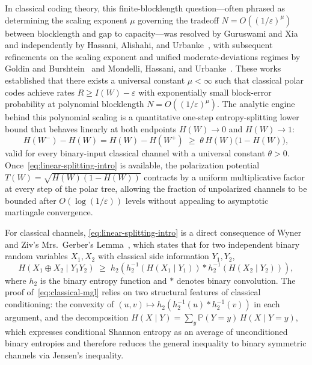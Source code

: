 \documentclass[10pt,a4paper]{article}
\numberwithin{equation}{section}
\theoremstyle{plain}
\theoremstyle{definition}
\theoremstyle{remark}
\newcommand{\bP}{\mathbb{P}}
\begin{document}
In classical coding theory, this finite-blocklength question—often phrased as determining the scaling exponent $\mu$ governing the tradeoff $N = O((1/\varepsilon)^{\mu})$ between blocklength and gap to capacity—was resolved by Guruswami and Xia~\cite{GuruswamiXia2015} and independently by Hassani, Alishahi, and Urbanke~\cite{HassaniAlishahiUrbanke2014}, with subsequent refinements on the scaling exponent and unified moderate-deviations regimes by Goldin and Burshtein~\cite{GoldinBurshtein2014} and Mondelli, Hassani, and Urbanke~\cite{MondelliHassaniUrbanke2016}. These works established that there exists a universal constant $\mu < \infty$ such that classical polar codes achieve rates $R \ge I(W) - \varepsilon$ with exponentially small block-error probability at polynomial blocklength $N = O((1/\varepsilon)^{\mu})$. The analytic engine behind this polynomial scaling is a quantitative one-step entropy-splitting lower bound that behaves linearly at both endpoints $H(W) \to 0$ and $H(W) \to 1$:
\begin{equation}\label{eq:linear-splitting-intro}
H(W^-) - H(W) = H(W) - H(W^+) \;\ge\; \theta\, H(W)\bigl(1 - H(W)\bigr),
\end{equation}
valid for every binary-input classical channel with a universal constant $\theta > 0$. Once~\eqref{eq:linear-splitting-intro} is available, the polarization potential $T(W) = \sqrt{H(W)(1 - H(W))}$ contracts by a uniform multiplicative factor at every step of the polar tree, allowing the fraction of unpolarized channels to be bounded after $O(\log(1/\varepsilon))$ levels without appealing to asymptotic martingale convergence.

For classical channels, \eqref{eq:linear-splitting-intro} is a direct consequence of Wyner and Ziv's Mrs.\ Gerber's Lemma~\cite{WynerZiv1973}, which states that for two independent binary random variables $X_1, X_2$ with classical side information $Y_1, Y_2$,
\begin{equation}\label{eq:classical-mgl}
H(X_1 \oplus X_2 \mid Y_1 Y_2) \;\ge\; h_2\!\left(h_2^{-1}(H(X_1 \mid Y_1)) * h_2^{-1}(H(X_2 \mid Y_2))\right),
\end{equation}
where $h_2$ is the binary entropy function and $*$ denotes binary convolution. The proof of~\eqref{eq:classical-mgl} relies on two structural features of classical conditioning: the convexity of $(u,v) \mapsto h_2(h_2^{-1}(u) * h_2^{-1}(v))$ in each argument, and the decomposition $H(X \mid Y) = \sum_y \bP(Y=y)\, H(X \mid Y=y)$, which expresses conditional Shannon entropy as an average of unconditioned binary entropies and therefore reduces the general inequality to binary symmetric channels via Jensen's inequality.
\end{document}
